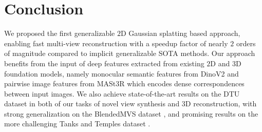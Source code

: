 \section{Conclusion}
\label{sec:conclusion}
\vspace{-5pt}
We proposed the first generalizable $2$D Gaussian splatting based approach, enabling fast multi-view reconstruction with a speedup factor of nearly $2$ orders of magnitude compared to implicit generalizable SOTA methods. Our approach benefits from the input of deep features extracted from existing $2$D and $3$D foundation models, namely monocular semantic features from DinoV2 \cite{oquab2023dinov2} and pairwise image features from MASt3R \cite{leroy2024grounding} which encodes dense correspondences between input images. We also achieve state-of-the-art results on the DTU dataset \cite{aanaes2016large} in both of our tasks of novel view synthesis and $3$D reconstruction, with strong generalization on the BlendedMVS dataset \cite{yao2020blendedmvs}, and promising results on the more challenging Tanks and Temples dataset \cite{knapitsch2017tanks}.       